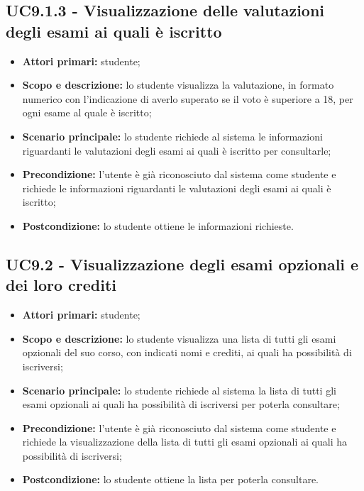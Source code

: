 \documentclass[AnalisiDeiRequisiti.tex]{subfiles}
\begin{document}
\subsection{UC9.1.3 - Visualizzazione delle valutazioni degli esami ai quali è iscritto}
\begin{itemize}
	\item \textbf{Attori primari:} studente;
	\item \textbf{Scopo e descrizione:} lo studente visualizza la valutazione, in formato numerico con l'indicazione di averlo superato se il voto è superiore a 18, per ogni esame al quale è iscritto;
	\item \textbf{Scenario principale:} lo studente richiede al sistema le informazioni riguardanti le valutazioni degli esami ai quali è iscritto per consultarle;
	\item \textbf{Precondizione:} l'utente è già riconosciuto dal sistema come studente e richiede le informazioni riguardanti le valutazioni degli esami ai quali è iscritto;
	\item \textbf{Postcondizione:} lo studente ottiene le informazioni richieste.
\end{itemize}

\subsection{UC9.2 - Visualizzazione degli esami opzionali e dei loro crediti}
\begin{itemize}
	\item \textbf{Attori primari:} studente;
	\item \textbf{Scopo e descrizione:} lo studente visualizza una lista di tutti gli esami opzionali del suo corso, con indicati nomi e crediti, ai quali ha possibilità di iscriversi;
	\item \textbf{Scenario principale:} lo studente richiede al sistema la lista di tutti gli esami opzionali ai quali ha possibilità di iscriversi per poterla consultare;
	\item \textbf{Precondizione:} l'utente è già riconosciuto dal sistema come studente e richiede la visualizzazione della lista di tutti gli esami opzionali ai quali ha possibilità di iscriversi;
	\item \textbf{Postcondizione:} lo studente ottiene la lista per poterla consultare.
\end{itemize}
\end{document}
